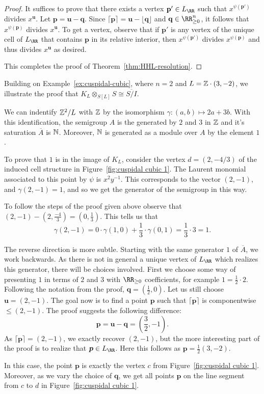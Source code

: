 \documentclass{amsart}
\begin{document}
\begin{proof}
  It suffices to prove that there exists a vertex $\mathbf{p}'\in L_{\RR}$ such that $x^{\psi(\mathbf{p}')}$ divides $x^{\mathbf{u}}$.
  Let $\mathbf{p}=\mathbf{u}-\mathbf{q}$. Since $\lceil \mathbf{p} \rceil = \mathbf{u} - \lfloor \mathbf{q}\rfloor$ and $\mathbf{q}\in \RR_{\geq 0}^n$, it follows that $x^{\psi(\mathbf{p})}$ divides $x^{\mathbf{u}}$. To get a vertex, observe that if $\mathbf{p}'$ is any vertex of the unique cell of $L_{\RR}$ that contains $\mathbf{p}$ in its relative interior, then $x^{\psi(\mathbf{p}')}$ divides $x^{\psi(\mathbf{p})}$ and thus divides $x^{\mathbf{u}}$ as desired.


 This completes the proof of Theorem~\ref{thm:HHL-resolution}.
 \end{proof}
  
\begin{example}
  Building on Example~\ref{ex:cuspidal-cubic}, where $n=2$ and $L=\mathbb Z\cdot (3,-2)$, we illustrate the proof that $K_L \otimes_{S[L]} S \cong \overline{S/I}$.

  We can  indentify $\mathbb Z^2/L$ with $\mathbb Z$ by the isomorphism $\gamma:(a,b)\mapsto 2a+3b$.  With this identification, the semigroup $A$ is the generated by $2$ and $3$ in $\mathbb Z$ and it's saturation $\overline{A}$ is $\mathbb N$. Moreover, $\mathbb N$ is generated as a module over $A$ by the  element $1$.

To prove that $1$ is in the image of $K_L$, consider the vertex $d=(2,-4/3)$ of the induced cell structure in Figure~\ref{fig:cuspidal cubic 1}. The Laurent monomial associated to this point by $\psi$ is $x^2y^{-1}$.
  This corresponds to the vector $(2,-1)$, and $\gamma(2,-1)=1$, and so we get the generator of the semigroup in this way.
  
  To follow the steps of the proof given above observe that $(2,-1)-(2,\frac{-4}{3})=(0,\frac{1}{3})$. This tells us that
  \[\gamma(2,-1) = 0\cdot \gamma(1,0) + \frac{1}{3}\cdot \gamma(0,1)=\frac{1}{3}\cdot 3 = 1.\]

  The reverse direction is more subtle. Starting with the same generator $1$ of $\overline{A}$, we work backwards. As there is not in general a unique vertex of $L_{\RR}$ which realizes this generator, there will be choices involved.
  First we choose some way of presenting $1$ in terms of $2$ and $3$ with $\RR_{\geq 0}$ coefficients, for example $1=\frac{1}{2}\cdot 2$.
 Following the notation from the proof, $\mathbf{q}=(\frac{1}{2},0)$. Let us still choose $\bm{u}=(2,-1)$.
  The goal now is to find a point $\bm{p}$ such that $\lceil \bm{p} \rceil$ is componentwise $\leq (2,-1)$.
  The proof suggests the following difference:
  \[\bm{p}=\bm{u}-\bm{q} = (\frac{3}{2},-1).\]
  As $\lceil \bm{p} \rceil = (2,-1)$, we exactly recover $(2,-1)$, but the more interesting part of the proof is to realize that $\bm{p}\in L_{\RR}$. Here this follows as $\bm{p}=\frac{1}{2}(3,-2)$.

  In this case, the point $\bm{p}$ is exactly the vertex $c$ from Figure~\ref{fig:cuspidal cubic 1}. Moreover, as we vary the choice of $\bm{q}$, we get all points $\bm p$ on the line segment from $c$ to $d$ in Figure~\ref{fig:cuspidal cubic 1}. \end{example}

\ifdefined\whole
\else


\expandafter\enddocument
\fi
\end{document}
